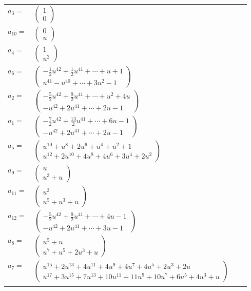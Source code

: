 \documentclass[1p]{elsarticle_modified}
\theoremstyle{definition}
\begin{document}
\begin{tabular}{m{7pt} m{180pt} m{7pt} m{180pt} }
\flushright $a_{3}=$&$\begin{pmatrix}1\\0\end{pmatrix}$ \\
\flushright $a_{10}=$&$\begin{pmatrix}0\\u\end{pmatrix}$ \\
\flushright $a_{4}=$&$\begin{pmatrix}1\\u^2\end{pmatrix}$ \\
\flushright $a_{6}=$&$\begin{pmatrix}-\frac{1}{2} u^{42}+\frac{1}{2} u^{41}+\cdots+u+1\\u^{41}- u^{40}+\cdots+3 u^2-1\end{pmatrix}$ \\
\flushright $a_{2}=$&$\begin{pmatrix}-\frac{5}{2} u^{42}+\frac{9}{2} u^{41}+\cdots+u^2+4 u\\- u^{42}+2 u^{41}+\cdots+2 u-1\end{pmatrix}$ \\
\flushright $a_{1}=$&$\begin{pmatrix}-\frac{7}{2} u^{42}+\frac{13}{2} u^{41}+\cdots+6 u-1\\- u^{42}+2 u^{41}+\cdots+2 u-1\end{pmatrix}$ \\
\flushright $a_{5}=$&$\begin{pmatrix}u^{10}+u^8+2 u^6+u^4+u^2+1\\u^{12}+2 u^{10}+4 u^8+4 u^6+3 u^4+2 u^2\end{pmatrix}$ \\
\flushright $a_{9}=$&$\begin{pmatrix}u\\u^3+u\end{pmatrix}$ \\
\flushright $a_{11}=$&$\begin{pmatrix}u^3\\u^5+u^3+u\end{pmatrix}$ \\
\flushright $a_{12}=$&$\begin{pmatrix}-\frac{5}{2} u^{42}+\frac{9}{2} u^{41}+\cdots+4 u-1\\- u^{42}+2 u^{41}+\cdots+3 u-1\end{pmatrix}$ \\
\flushright $a_{8}=$&$\begin{pmatrix}u^5+u\\u^7+u^5+2 u^3+u\end{pmatrix}$ \\
\flushright $a_{7}=$&$\begin{pmatrix}u^{15}+2 u^{13}+4 u^{11}+4 u^9+4 u^7+4 u^5+2 u^3+2 u\\u^{17}+3 u^{15}+7 u^{13}+10 u^{11}+11 u^9+10 u^7+6 u^5+4 u^3+u\end{pmatrix}$\\&\end{tabular}
\end{document}
